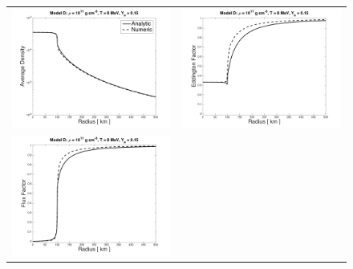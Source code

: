 \documentclass[11pt,letterpaper,twoside,english,final]{article}
\begin{document}
\begin{figure}[h]
  \centering
  \begin{tabular}{cc}
    \includegraphics[scale=0.4]{./Figures/HomogeneousSphereTable_D_Density} &
    \includegraphics[scale=0.4]{./Figures/HomogeneousSphereTable_D_EddingtonFactor} \\
    \includegraphics[scale=0.4]{./Figures/HomogeneousSphereTable_D_FluxFactor} &

\end{tabular}
\end{figure}
\end{document}
